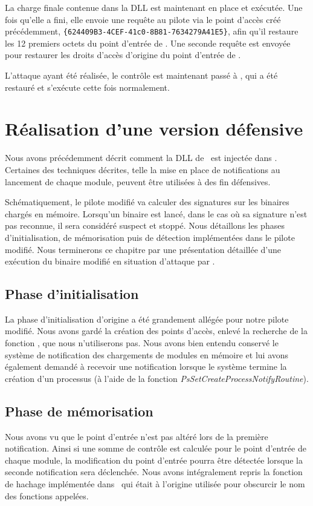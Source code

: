 La charge finale contenue dans la DLL est maintenant en place et exécutée.
Une fois qu'elle a fini, elle envoie une requête au pilote via le point d'accès créé précédemment, \texttt{\{624409B3-4CEF-41c0-8B81-7634279A41E5\}}, afin qu'il restaure les 12 premiers octets du point d'entrée de \services.
Une seconde requête est envoyée pour restaurer les droits d'accès d'origine du point d'entrée de \services.

L'attaque ayant été réalisée, le contrôle est maintenant passé à \services, qui a été restauré et s'exécute cette fois normalement.

\section{Réalisation d'une version défensive}
Nous avons précédemment décrit comment la DLL de \duqu\ est injectée dans \services.
Certaines des techniques décrites, telle la mise en place de notifications au lancement de chaque module, peuvent être utilisées à des fin défensives.

Schématiquement, le pilote modifié va calculer des signatures sur les binaires chargés en mémoire.
Lorsqu'un binaire est lancé, dans le cas où sa signature n'est pas reconnue, il sera considéré suspect et stoppé.
Nous détaillons les phases d'initialisation, de mémorisation puis de détection implémentées dans le pilote modifié.
Nous terminerons ce chapitre par une présentation détaillée d'une exécution du binaire modifié en situation d'attaque par \duqu.

\subsection{Phase d'initialisation}
La phase d'initialisation d'origine a été grandement allégée pour notre pilote modifié.
Nous avons gardé la création des points d'accès, enlevé la recherche de la fonction \ZwP, que nous n'utiliserons pas.
Nous avons bien entendu conservé le système de notification des chargements de modules en mémoire et lui avons également demandé à recevoir une notification lorsque le système termine la création d'un processus (à l'aide de la fonction \emph{PsSetCreateProcessNotifyRoutine}).

\subsection{Phase de mémorisation}
Nous avons vu que le point d'entrée n'est pas altéré lors de la première notification.
Ainsi si une somme de contrôle est calculée pour le point d'entrée de chaque module, la modification du point d'entrée pourra être détectée lorsque la seconde notification sera déclenchée.
Nous avons intégralement repris la fonction de hachage implémentée dans \duqu\ qui était à l'origine utilisée pour obscurcir le nom des fonctions appelées.


